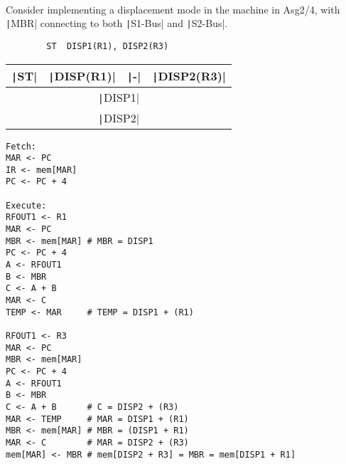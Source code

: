 \documentclass[answers]{exam}
\begin{document}
\begin{questions}
    \newpage

     \\
    Consider implementing a displacement mode in the machine in Asg2/4, with \texttt|MBR| connecting to both \texttt|S1-Bus| and \texttt|S2-Bus|.

    \begin{center}
        \begin{verbatim}
        ST  DISP1(R1), DISP2(R3)
        \end{verbatim}
    \end{center}

    \begin{table}[htb]
        \centering
        \setlength{\tabcolsep}{30pt}
        \begin{tabular}{|c|c|c|c|}
            \hline
            \texttt|ST|
             & \texttt|DISP(R1)|
             & \texttt|-|
             & \texttt|DISP2(R3)|                     \\ \hline\hline
            \multicolumn{4}{|c|}{\texttt|DISP1|}      \\ \hline
            \multicolumn{4}{|c|}{\texttt|DISP2|}      \\ \hline
        \end{tabular}
    \end{table}

    \begin{solution}
        \begin{verbatim}
Fetch:
MAR <- PC
IR <- mem[MAR]
PC <- PC + 4

Execute: 
RFOUT1 <- R1
MAR <- PC
MBR <- mem[MAR] # MBR = DISP1
PC <- PC + 4
A <- RFOUT1
B <- MBR
C <- A + B
MAR <- C
TEMP <- MAR     # TEMP = DISP1 + (R1)

RFOUT1 <- R3
MAR <- PC
MBR <- mem[MAR]
PC <- PC + 4
A <- RFOUT1
B <- MBR
C <- A + B      # C = DISP2 + (R3)
MAR <- TEMP     # MAR = DISP1 + (R1)
MBR <- mem[MAR] # MBR = (DISP1 + R1)
MAR <- C        # MAR = DISP2 + (R3)
mem[MAR] <- MBR # mem[DISP2 + R3] = MBR = mem[DISP1 + R1]
        \end{verbatim}
    \end{solution}

\end{questions}
\end{document}
